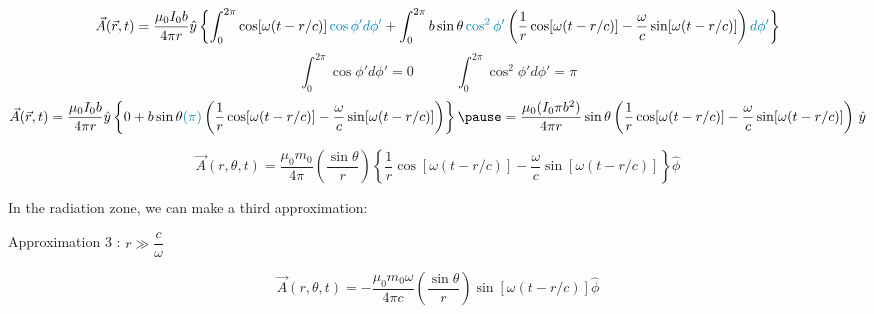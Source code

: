 \documentclass[10pt,aspectratio=169]{beamer}
\begin{document}
\begin{frame}
	\small
	\begin{dmath*}
		\vec{A}(\vec{r},t) = \frac{\mu_{0} I_{0} b}{4 \pi r} \hat{y} \left\{ \int_{0}^{2 \pi}\cos [\omega(t-r / c)] \color{high}\cos \phi^{\prime} d \phi^{\prime} \color{black} + \int_{0}^{2 \pi} b \sin \theta \color{high} \cos^2 \phi^{\prime} \color{black}\left(\frac{1}{r}\cos [\omega(t-r / c)] - \frac{\omega}{c} \sin [\omega(t-r / c)]\right) \color{high}d\phi' \color{black}\right\}
	\end{dmath*}
		\pause
		\[ \int_{0}^{2\pi} \cos \phi' d\phi' = 0 \quad\qquad 	\int_{0}^{2\pi} \cos^2 \phi' d\phi' = \pi  \] \pause
	\begin{dmath*}
		\vec{A}(\vec{r},t) = \frac{\mu_{0} I_{0} b}{4 \pi r} \hat{y} \left\{ 0 + b \sin \theta \color{high} (\pi) \color{black}\left(\frac{1}{r}\cos [\omega(t-r / c)] - \frac{\omega}{c} \sin [\omega(t-r / c)]\right) \color{black}\right\}\pause
		= \frac{\mu_{0} (I_{0} \pi b^2)}{4 \pi r}  \sin \theta \left(\frac{1}{r}\cos [\omega(t-r / c)] - \frac{\omega}{c} \sin [\omega(t-r / c)]\right) \color{black}\, \hat{y}
	\end{dmath*}
	\pause
	\begin{tcolorbox}
		\begin{equation}\label{eqn : finally}
		\vec{A}(r, \theta, t)=\frac{\mu_{0} m_{0}}{4 \pi}\left(\frac{\sin \theta}{r}\right)\left\{\frac{1}{r} \cos [\omega(t-r / c)]-\frac{\omega}{c} \sin [\omega(t-r / c)]\right\} \hat{\phi}
		\end{equation}
	\end{tcolorbox}
\end{frame}

\begin{frame}
	In the radiation zone, we can make a third approximation:\pause
	\begin{tcolorbox}[width = 6cm]
		\begin{center}
			Approximation 3 : $ r \gg \dfrac{c}{\omega} $
		\end{center}
	\end{tcolorbox}
	\pause
	\begin{tcolorbox}[colframe = amber, colback = amber!20]
		\begin{equation}\label{eqn : FINALLYY}
		\vec{A}(r, \theta, t)=-\frac{\mu_{0} m_{0} \omega}{4 \pi c}\left(\frac{\sin \theta}{r}\right) \sin [\omega(t-r / c)] \hat{\phi}
		\end{equation}
	\end{tcolorbox}
\end{frame}
\end{document}
